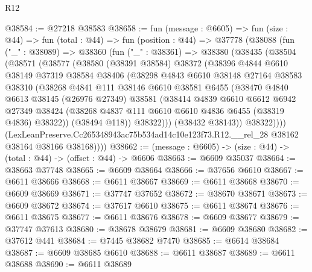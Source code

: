 \begin{lexlean}{R12}
\begin{coremodule}
@38584 := @27218 @38583
@38658 := fun (message : @6605) =>
  fun (size : @44) =>
  fun (total : @44) =>
  fun (position : @44) =>
  @37778
    (@38088
      (fun ("_" : @38089) =>
      @38360
        (fun ("_" : @38361) =>
        @38380
          (@38435
            (@38504
              (@38571
                (@38577
                  (@38580
                    (@38391 @38584)
                    @38372
                    (@38396
                      @4844
                      @6610
                      @38149
                      @37319
                      @38584
                      @38406
                      (@38298
                        @4843
                        @6610
                        @38148
                        @27164
                        @38583
                        @38310
                        (@38268
                          @4841
                          @111
                          @38146
                          @6610
                          @38581
                          @6455
                          (@38470
                            @4840
                            @6613
                            @38145
                            (@26976 @27349)
                            @38581
                            (@38414
                              @4839
                              @6610
                              @6612
                              @6942
                              @27349
                              @38424
                              (@38268 @4837 @111 @6610 @6610 @4836 @6455 (@38319 @4836) @38322))
                            (@38494 @118))
                          @38322)))
                    (@38432 @38143))
                  @38322))))
          (LexLeanPreserve.Cc265348943ac75b534ad14c10e123f73.R12.__rel_28
            @38162
            @38164
            @38166
            @38168))))
@38662 := (message : @6605) -> (size : @44) -> (total : @44) -> (offset : @44) -> @6606
@38663 := @6609 @35037
@38664 := @38663 @37748
@38665 := @6609 @38664
@38666 := @37656 @6610
@38667 := @6611 @38666
@38668 := @6611 @38667
@38669 := @6611 @38668
@38670 := @6609 @38669
@38671 := @37747 @37652
@38672 := @38670 @38671
@38673 := @6609 @38672
@38674 := @37617 @6610
@38675 := @6611 @38674
@38676 := @6611 @38675
@38677 := @6611 @38676
@38678 := @6609 @38677
@38679 := @37747 @37613
@38680 := @38678 @38679
@38681 := @6609 @38680
@38682 := @37612 @441
@38684 := @7445 @38682 @7470
@38685 := @6614 @38684
@38687 := @6609 @38685 @6610
@38688 := @6611 @38687
@38689 := @6611 @38688
@38690 := @6611 @38689

\end{coremodule}
\end{lexlean}
